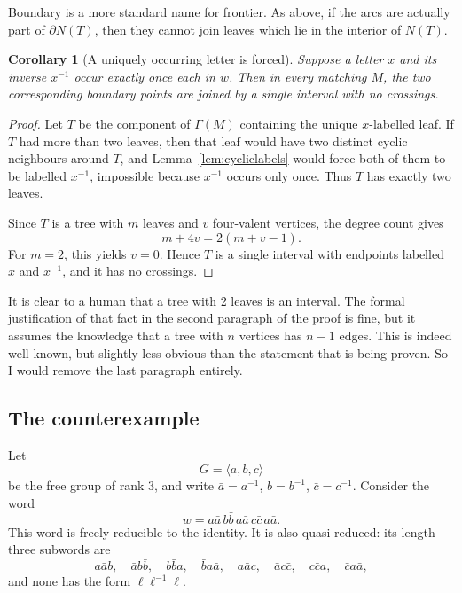 \documentclass[12pt]{article}
\newtheorem{corollary}{Corollary}
\newcommand{\review}[1]{\begin{reviewbox}#1\end{reviewbox}}
\begin{document}
\review{Boundary is a more standard name for frontier. As above, if the arcs are actually part of $\partial N(T)$, then they cannot join leaves which lie in the interior of $N(T)$.}

\begin{corollary}[A uniquely occurring letter is forced]\label{cor:forced}
Suppose a letter \(x\) and its inverse \(x^{-1}\) occur exactly once each in \(w\).  Then in every matching \(M\), the two corresponding boundary points are joined by a single interval with no crossings.
\end{corollary}

\begin{proof}
Let \(T\) be the component of \(\Gamma(M)\) containing the unique \(x\)-labelled leaf.  If \(T\) had more than two leaves, then that leaf would have two distinct cyclic neighbours around \(T\), and Lemma~\ref{lem:cycliclabels} would force both of them to be labelled \(x^{-1}\), impossible because \(x^{-1}\) occurs only once.  Thus \(T\) has exactly two leaves.

Since \(T\) is a tree with \(m\) leaves and \(v\) four-valent vertices, the degree count gives
\[
m+4v=2(m+v-1).
\]
For \(m=2\), this yields \(v=0\).  Hence \(T\) is a single interval with endpoints labelled \(x\) and \(x^{-1}\), and it has no crossings.
\end{proof}
\review{It is clear to a human that a tree with 2 leaves is an interval. The formal justification of that fact in the second paragraph of the proof is fine, but it assumes the knowledge that a tree with $n$ vertices has $n-1$ edges. This is indeed well-known, but slightly less obvious than the statement that is being proven. So I would remove the last paragraph entirely.}

\subsection{The counterexample}

Let
\[
G=\langle a,b,c\rangle
\]
be the free group of rank \(3\), and write \(\bar a=a^{-1}\), \(\bar b=b^{-1}\), \(\bar c=c^{-1}\).  Consider the word
\[
w=a\bar a\, b\bar b\, a\bar a\, c\bar c\, a\bar a.
\]
This word is freely reducible to the identity.  It is also quasi-reduced: its length-three subwords are
\[
a\bar a b,\quad
\bar a b\bar b,\quad
b\bar b a,\quad
\bar b a\bar a,\quad
a\bar a c,\quad
\bar a c\bar c,\quad
c\bar c a,\quad
\bar c a\bar a,
\]
and none has the form \(\ell\ell^{-1}\ell\).
\end{document}
